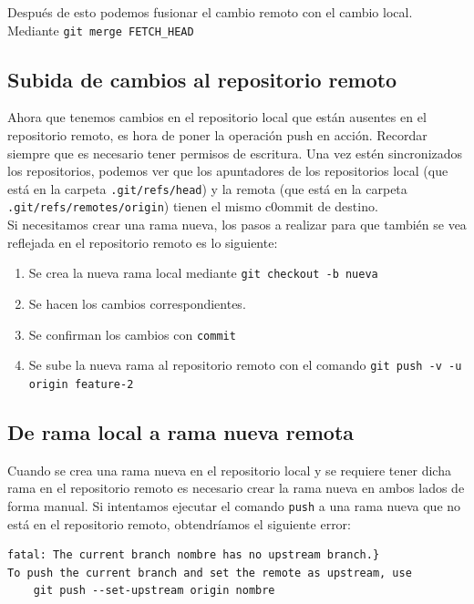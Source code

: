 Después de esto podemos fusionar el cambio remoto con el cambio local. Mediante \texttt{git merge FETCH\_HEAD} 

\subsection{Subida de cambios al repositorio remoto}

Ahora que tenemos cambios en el repositorio local que están ausentes en el repositorio remoto, es hora de poner la operación push en acción. Recordar siempre que es necesario tener permisos de escritura. Una vez estén sincronizados los repositorios, podemos ver que los apuntadores de los repositorios local (que está en la carpeta \texttt{.git/refs/head}) y la remota (que está en la carpeta \texttt{.git/refs/remotes/origin}) tienen el mismo c0ommit de destino. \\

Si necesitamos crear una rama nueva, los pasos a realizar para que también se vea reflejada en el repositorio remoto es lo siguiente:

\begin{enumerate}
    \item Se crea la nueva rama local mediante \texttt{git checkout -b nueva}
    \item Se hacen los cambios correspondientes.
    \item Se confirman los cambios con \texttt{commit}
    \item Se sube la nueva rama al repositorio remoto con el comando \texttt{git push -v -u origin feature-2}
\end{enumerate}

\subsection{De rama local a rama nueva remota}

Cuando se crea una rama nueva en el repositorio local y se requiere tener dicha rama en el repositorio remoto es necesario crear la rama nueva en ambos lados de forma manual. Si intentamos ejecutar el comando \texttt{push} a una rama nueva que no está en el repositorio remoto, obtendríamos el siguiente error:

\begin{verbatim}
fatal: The current branch nombre has no upstream branch.}
To push the current branch and set the remote as upstream, use
    git push --set-upstream origin nombre
\end{verbatim}

